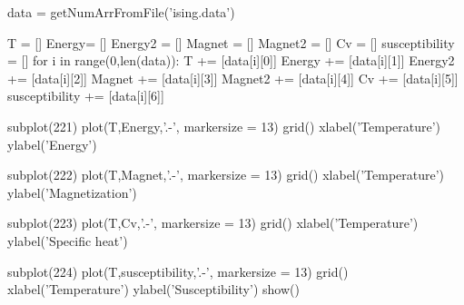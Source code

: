 \documentclass[11pt,a4paper,boxed]{caspset}
\begin{document}
\begin{subappendices}
\begin{python}
data = getNumArrFromFile('ising.data')

T = []
Energy= []
Energy2 = []
Magnet = []
Magnet2 = []
Cv = []
susceptibility = []
for i in range(0,len(data)):
    T += [data[i][0]]
    Energy += [data[i][1]]
    Energy2 += [data[i][2]]
    Magnet += [data[i][3]]
    Magnet2 += [data[i][4]]
    Cv += [data[i][5]]
    susceptibility += [data[i][6]]

subplot(221)
plot(T,Energy,'.-', markersize = 13)
grid()
xlabel('Temperature')
ylabel('Energy')

subplot(222)
plot(T,Magnet,'.-', markersize = 13)
grid()
xlabel('Temperature')
ylabel('Magnetization')

subplot(223)
plot(T,Cv,'.-', markersize = 13)
grid()
xlabel('Temperature')
ylabel('Specific heat')

subplot(224)
plot(T,susceptibility,'.-', markersize = 13)
grid()
xlabel('Temperature')
ylabel('Susceptibility')
show()
\end{python}
\end{subappendices}
\end{document}
